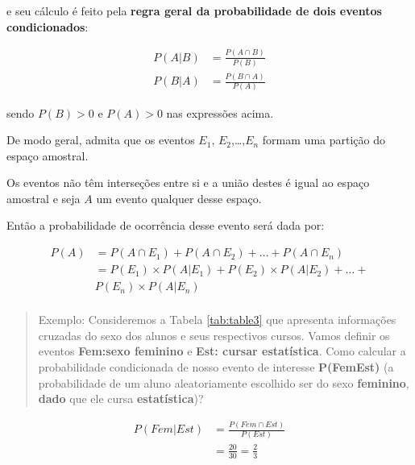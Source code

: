 \documentclass[
]{book}
\begin{document}
\hfill\break

e seu cálculo é feito pela \textbf{regra geral da probabilidade de dois eventos condicionados}:

\hfill\break

\begin{align*}
P(A|B) & = \frac{ P(A\cap B)}{ P(B)} \\
P(B|A) & = \frac{ P(B\cap A)}{ P(A)}
\end{align*}

\hfill\break

sendo \(P(B)>0\) e \(P(A)>0\) nas expressões acima.

\hfill\break

De modo geral, admita que os eventos \(E_{1}\), \(E_{2}\),\ldots,\(E_{n}\) formam uma partição do espaço amostral.

\hfill\break

Os eventos não têm interseções entre si e a união destes é igual ao espaço amostral e seja \(A\) um evento qualquer desse espaço.

\hfill\break

Então a probabilidade de ocorrência desse evento será dada por:

\hfill\break

\begin{align*}
P(A) & = P(A \cap E_{1}) +  P(A \cap E_{2}) + \dots + P(A \cap E_{n}) \\
     & = P(E_{1}) \times P(A|E_{1}) + P(E_{2}) \times P(A|E_{2}) + \dots + \\
     & P(E_{n}) \times P(A|E_{n})\\
\end{align*}

\hfill\break

\begin{quote}
Exemplo: Consideremos a Tabela \ref{tab:table3} que apresenta informações cruzadas do sexo dos alunos e seus respectivos cursos. Vamos definir os eventos \textbf{Fem:sexo feminino} e \textbf{Est: cursar estatística}. Como calcular a probabilidade condicionada de nosso evento de interesse \textbf{P(Fem\textbar Est)} (a probabilidade de um aluno aleatoriamente escolhido ser do sexo \textbf{feminino}, \textbf{dado} que ele cursa \textbf{estatística})?
\end{quote}

\hfill\break

\begin{align*}
P(Fem|Est) & = \frac{ P(Fem \cap Est)}{ P(Est)} \\
           & = \frac{20}{30} = \frac{2}{3}    
\end{align*}
\end{document}
